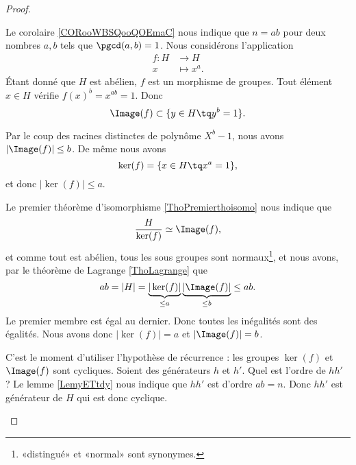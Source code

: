 \begin{proof}
\begin{subproof}
\begin{subproof}
			\begin{subproof}
				\spitem[Un morphisme]
				Le corolaire \ref{CORooWBSQooQOEmaC} nous indique que \( n=ab\) pour deux nombres \( a,b\) tels que \( \pgcd(a,b)=1\). Nous considérons l'application
				\begin{equation}
					\begin{aligned}
						f\colon H & \to H        \\
						x         & \mapsto x^a.
					\end{aligned}
				\end{equation}
				Étant donné que \( H\) est abélien, \( f\) est un morphisme de groupes. Tout élément \( x\in H\) vérifie \( f(x)^b=x^{ab}=1\). Donc
				\begin{equation}
					\Image(f)\subset\{ y\in H\tq y^b=1 \}.
				\end{equation}

				Par le coup des racines distinctes de polynôme \( X^b-1\), nous avons \( | \Image(f) |\leq b\). De même nous avons
				\begin{equation}
					\ker(f)=\{ x\in H\tq x^a=1 \},
				\end{equation}
				et donc \( | \ker(f) |\leq a\).

				Le premier théorème d'isomorphisme \ref{ThoPremierthoisomo} nous indique que
				\begin{equation}
					\frac{ H }{ \ker(f) }\simeq \Image(f),
				\end{equation}
				et comme tout est abélien, tous les sous groupes sont normaux\footnote{«distingué» et «normal» sont synonymes.}, et nous avons, par le théorème de Lagrange \ref{ThoLagrange} que
				\begin{equation}
					ab = | H |=\underbrace{| \ker(f) |}_{\leq a}\underbrace{| \Image(f) |}_{\leq b}\leq ab.
				\end{equation}
				Le premier membre est égal au dernier. Donc toutes les inégalités sont des égalités. Nous avons donc \( | \ker(f) |=a\) et \( | \Image(f) |=b\).

				C'est le moment d'utiliser l'hypothèse de récurrence : les groupes \( \ker(f)\) et \( \Image(f)\) sont cycliques. Soient des générateurs \( h\) et \( h'\). Quel est l'ordre de \( hh'\) ? Le lemme \ref{LemyETtdy} nous indique que \( hh'\) est d'ordre \( ab=n\). Donc \( hh'\) est générateur de \( H\) qui est donc cyclique.
			\end{subproof}
		\end{subproof}
	\end{subproof}
\end{proof}
